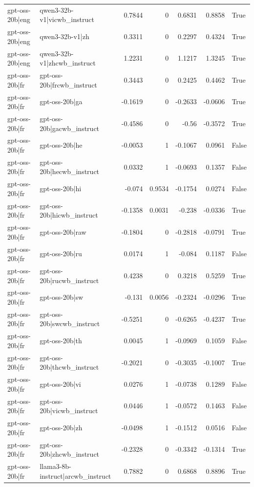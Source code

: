 \begin{table}
\begin{tabular}{l l r r r r l}
gpt-oss-20b|eng & qwen3-32b-v1|vicwb_instruct & 0.7844 & 0 & 0.6831 & 0.8858 & True \\
gpt-oss-20b|eng & qwen3-32b-v1|zh & 0.3311 & 0 & 0.2297 & 0.4324 & True \\
gpt-oss-20b|eng & qwen3-32b-v1|zhcwb_instruct & 1.2231 & 0 & 1.1217 & 1.3245 & True \\
gpt-oss-20b|fr & gpt-oss-20b|frcwb_instruct & 0.3443 & 0 & 0.2425 & 0.4462 & True \\
gpt-oss-20b|fr & gpt-oss-20b|ga & -0.1619 & 0 & -0.2633 & -0.0606 & True \\
gpt-oss-20b|fr & gpt-oss-20b|gacwb_instruct & -0.4586 & 0 & -0.56 & -0.3572 & True \\
gpt-oss-20b|fr & gpt-oss-20b|he & -0.0053 & 1 & -0.1067 & 0.0961 & False \\
gpt-oss-20b|fr & gpt-oss-20b|hecwb_instruct & 0.0332 & 1 & -0.0693 & 0.1357 & False \\
gpt-oss-20b|fr & gpt-oss-20b|hi & -0.074 & 0.9534 & -0.1754 & 0.0274 & False \\
gpt-oss-20b|fr & gpt-oss-20b|hicwb_instruct & -0.1358 & 0.0031 & -0.238 & -0.0336 & True \\
gpt-oss-20b|fr & gpt-oss-20b|raw & -0.1804 & 0 & -0.2818 & -0.0791 & True \\
gpt-oss-20b|fr & gpt-oss-20b|ru & 0.0174 & 1 & -0.084 & 0.1187 & False \\
gpt-oss-20b|fr & gpt-oss-20b|rucwb_instruct & 0.4238 & 0 & 0.3218 & 0.5259 & True \\
gpt-oss-20b|fr & gpt-oss-20b|sw & -0.131 & 0.0056 & -0.2324 & -0.0296 & True \\
gpt-oss-20b|fr & gpt-oss-20b|swcwb_instruct & -0.5251 & 0 & -0.6265 & -0.4237 & True \\
gpt-oss-20b|fr & gpt-oss-20b|th & 0.0045 & 1 & -0.0969 & 0.1059 & False \\
gpt-oss-20b|fr & gpt-oss-20b|thcwb_instruct & -0.2021 & 0 & -0.3035 & -0.1007 & True \\
gpt-oss-20b|fr & gpt-oss-20b|vi & 0.0276 & 1 & -0.0738 & 0.1289 & False \\
gpt-oss-20b|fr & gpt-oss-20b|vicwb_instruct & 0.0446 & 1 & -0.0572 & 0.1463 & False \\
gpt-oss-20b|fr & gpt-oss-20b|zh & -0.0498 & 1 & -0.1512 & 0.0516 & False \\
gpt-oss-20b|fr & gpt-oss-20b|zhcwb_instruct & -0.2328 & 0 & -0.3342 & -0.1314 & True \\
gpt-oss-20b|fr & llama3-8b-instruct|arcwb_instruct & 0.7882 & 0 & 0.6868 & 0.8896 & True \\

\end{tabular}
\end{table}
